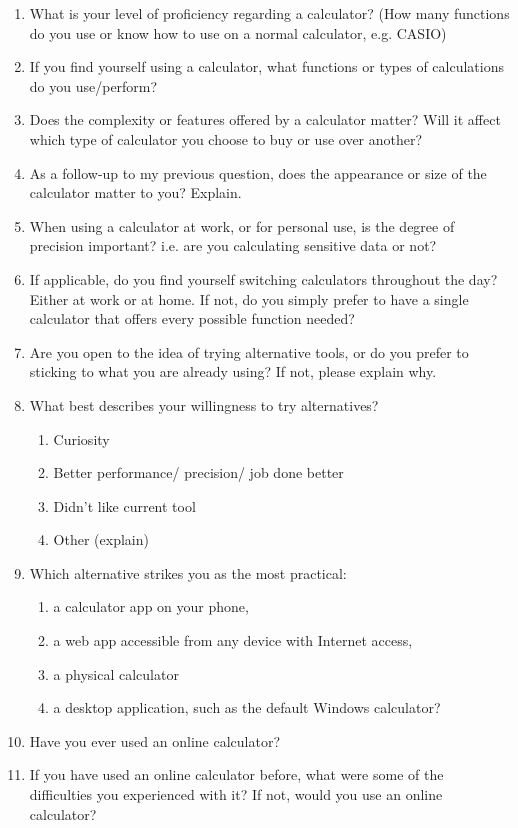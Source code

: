 \documentclass[11pt,onside]{report}
\begin{document}
\begin{enumerate}
    \item What is your level of proficiency regarding a calculator? (How many functions do you use or know how to use on a normal calculator, e.g. CASIO)
    \item If you find yourself using a calculator, what functions or types of calculations do you use/perform?
    \item Does the complexity or features offered by a calculator matter? Will it affect which type of calculator you choose to buy or use over another?
    \item As a follow-up to my previous question, does the appearance or size of the calculator matter to you? Explain.
    \item When using a calculator at work, or for personal use, is the degree of precision important? i.e. are you calculating sensitive data or not?
    \item If applicable, do you find yourself switching calculators throughout the day? Either at work or at home. If not, do you simply prefer to have a single calculator that offers every possible function needed?
    \item Are you open to the idea of trying alternative tools, or do you prefer to sticking to what you are already using? If not, please explain why.
    \item What best describes your willingness to try alternatives?
    \begin{enumerate}
        \item Curiosity
        \item Better performance/ precision/ job done better
        \item Didn’t like current tool
        \item Other (explain)
    \end{enumerate}
    \item Which alternative strikes you as the most practical:
    \begin{enumerate}
        \item a calculator app on your phone,
        \item a web app accessible from any device with Internet access,
        \item a physical calculator
        \item a desktop application, such as the default Windows calculator?
    \end{enumerate}
    \item Have you ever used an online calculator?
    \item If you have used an online calculator before, what were some of the difficulties you experienced with it? If not, would you use an online calculator?

\end{enumerate}
\end{document}

